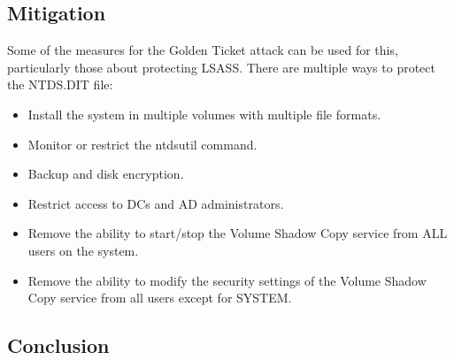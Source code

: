 \subsection{Mitigation}
Some of the measures for the Golden Ticket attack can be used for this, particularly those about protecting LSASS.
\linej
There are multiple ways to protect the NTDS.DIT file\cite{protect_NTDS}\cite{hood}:
\begin{itemize}
	\item Install the system in multiple volumes with multiple file formats.
	\item Monitor or restrict the ntdsutil command.
	\item Backup and disk encryption.
	\item Restrict access to DCs and AD administrators.
	\item Remove the ability to start/stop the Volume Shadow Copy service from ALL users on the system.
	\item Remove the ability to modify the security settings of the Volume Shadow Copy service from all users except for SYSTEM.
\end{itemize}

\subsection{Conclusion}
